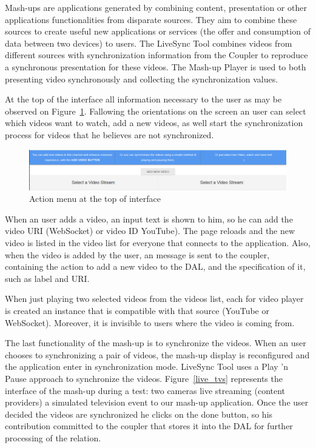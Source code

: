 
Mash-ups are applications generated by combining content, presentation or other applications functionalities from disparate sources. They aim to combine these sources to create useful new applications or services (the offer and consumption of data between two devices) to users. The LiveSync Tool combines videos from different sources with synchronization information from the Coupler to reproduce a synchronous presentation for these videos. The Mash-up Player is used to both presenting video synchronously and collecting the synchronization values. 

At the top of the interface all information necessary to the user as may be observed on Figure~\ref{menu_add_view}. Fallowing the orientations on the screen an user can select which videos want to watch, add a new videos, as well start the synchronization process for videos that he believes are not synchronized. 

\begin{figure}[h!]
	\centerline{\includegraphics[scale=0.3] {figures/menu_add_view}}
	\caption{Action menu at the top of interface}
	\label{menu_add_view}
\end{figure}

When an user adds a video, an input text is shown to him, so he can add the video URI (WebSocket) or video ID YouTube). The page reloads and the new video is listed in the video list for everyone that connects to the application. Also, when the video is added by the user, an message is sent to the coupler, containing the action to add a new video to the DAL, and the specification of it, such as label and URI.

When just playing two selected videos from the videos list, each for video player is created an instance that is compatible with that source (YouTube or WebSocket). Moreover, it is invisible to users where the video is coming from.

The last functionality of the mash-up is to synchronize the videos. When an user chooses to synchronizing a pair of videos, the mash-up display is reconfigured and the application enter in synchronization mode. LiveSync Tool uses a Play ’n Pause approach to synchronize the videos. Figure~\ref{live_tvs} represents the interface of the mash-up during a test: two cameras live streaming (content providers) a simulated television event to our mash-up application. Once the user decided the videos are synchronized he clicks on the done button, so his contribution committed to the coupler that stores it into the DAL for further processing of the relation.

